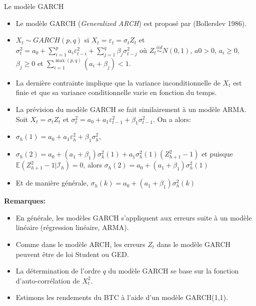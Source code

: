 \documentclass[
  ignorenonframetext,
]{beamer}
\begin{document}
\begin{frame}{Le modèle GARCH}
\protect\hypertarget{le-moduxe8le-garch}{}
\begin{itemize}[<+->]
\item
  Le modèle GARCH (\emph{Generalized ARCH}) est proposé par (Bollerslev
  1986).
\item
  \(X_t\sim GARCH(p,q)\) si \(X_t=\varepsilon_t=\sigma_tZ_t\) et
  \(\sigma^2_t=a_0+\displaystyle \sum_{i=1}^pa_i\varepsilon^2_{t-i}+\displaystyle \sum_{j=1}^q\beta_j\sigma^2_{t-j}\)
  où \(Z_t \stackrel{iid}{\sim}N(0,1)\), \(a0 >0\), \(a_i \geq 0\),
  \(\beta_j \geq 0\) et
  \(\displaystyle \sum_{i=1}^{\max(p,q)}(a_i+\beta_j) < 1\).
\item
  La dernière contrainte implique que la variance inconditionnelle de
  \(X_t\) est finie et que sa variance conditionnelle varie en fonction
  du temps.
\item
  La prévision du modèle GARCH se fait similairement à un modèle ARMA.
  Soit \(X_t=\sigma_t Z_t\) et
  \(\sigma^2_t=a_0+a_1 \varepsilon^2_{t-1}+\beta_1\sigma^2_{t-1}\). On a
  alors:
\item
  \(\sigma_h(1)=a_0+a_1\varepsilon^2_h+\beta_1\sigma^2_h\),
\item
  \(\sigma_h(2)=a_0+(a_1+\beta_1)\sigma^2_h(1)+a_1\sigma^2_h(1)(Z^2_{h+1}-1)\)
  et puisque \(\mathbb{E}(Z^2_{h+1}-1|\mathcal{I}_h)=0\), alors
  \(\sigma_h(2)=a_0+(a_1+\beta_1)\sigma^2_h(1)\)
\item
  Et de manière générale, \(\sigma_h(k)=a_0+(a_1+\beta_1)\sigma^2_h(k)\)
\end{itemize}
\end{frame}
\begin{frame}
\textbf{Remarques:}
\begin{itemize}[<+->]
\item
  En générale, les modèles GARCH s'appliquent aux erreurs suite à un
  modèle linéaire (régression linéaire, ARMA).
\item
  Comme dans le modèle ARCH, les erreurs \(Z_t\) dans le modèle GARCH
  peuvent être de loi Student ou GED.
\item
  La détermination de l'ordre \(q\) du modèle GARCH se base sur la
  fonction d'auto-corrélation de \(X_t^2\).
\item
  Estimons les rendements du BTC à l'aide d'un modèle GARCH(1,1).
\end{itemize}
\end{frame}
\end{document}
